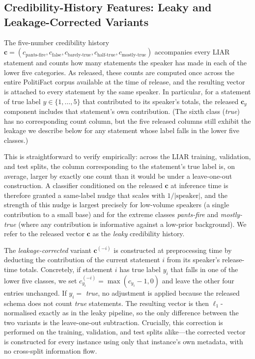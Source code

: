\documentclass[journal]{IEEEtran}
\begin{document}
\subsection{Credibility-History Features: Leaky and Leakage-Corrected Variants}
\label{subsec:leakage}
The five-number credibility history $\mathbf{c} = (c_{\text{pants-fire}}, c_{\text{false}}, c_{\text{barely-true}}, c_{\text{half-true}}, c_{\text{mostly-true}})$ accompanies every LIAR statement and counts how many statements the speaker has made in each of the lower five categories. As released, these counts are computed once across the entire PolitiFact corpus available at the time of release, and the resulting vector is attached to every statement by the same speaker. In particular, for a statement of true label $y \in \{1, \ldots, 5\}$ that contributed to its speaker's totals, the released $\mathbf{c}_y$ component includes that statement's own contribution. (The sixth class (\emph{true}) has no corresponding count column, but the five released columns still exhibit the leakage we describe below for any statement whose label falls in the lower five classes.)

This is straightforward to verify empirically: across the LIAR training, validation, and test splits, the column corresponding to the statement's true label is, on average, larger by exactly one count than it would be under a leave-one-out construction. A classifier conditioned on the released $\mathbf{c}$ at inference time is therefore granted a same-label nudge that scales with $1 / |\text{speaker}|$, and the strength of this nudge is largest precisely for low-volume speakers (a single contribution to a small base) and for the extreme classes \emph{pants-fire} and \emph{mostly-true} (where any contribution is informative against a low-prior background). We refer to the released vector $\mathbf{c}$ as the \emph{leaky} credibility history.

The \emph{leakage-corrected} variant $\mathbf{c}^{(-i)}$ is constructed at preprocessing time by deducting the contribution of the current statement $i$ from its speaker's release-time totals. Concretely, if statement $i$ has true label $y_i$ that falls in one of the lower five classes, we set $c^{(-i)}_{y_i} = \max(c_{y_i} - 1, 0)$ and leave the other four entries unchanged. If $y_i = $ \emph{true}, no adjustment is applied because the released schema does not count \emph{true} statements. The resulting vector is then $\ell_1$-normalised exactly as in the leaky pipeline, so the only difference between the two variants is the leave-one-out subtraction. Crucially, this correction is performed on the training, validation, and test splits alike---the corrected vector is constructed for every instance using only that instance's own metadata, with no cross-split information flow.
\end{document}
